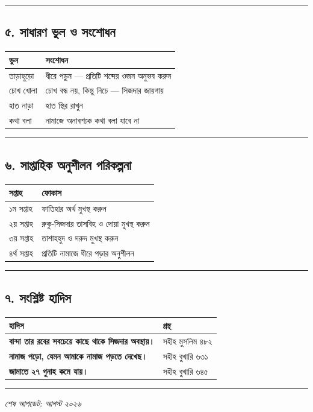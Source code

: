 \medskip\hrule\medskip

\subsection*{৫. সাধারণ ভুল ও সংশোধন}

\begin{table}[h]\centering\small
\begin{tabular}{ll}
ভুল & সংশোধন \\
\hline
তাড়াহুড়ো & ধীরে পড়ুন — প্রতিটি শব্দের ওজন অনুভব করুন \\
চোখ খোলা & চোখ বন্ধ নয়, কিন্তু নিচে — সিজদার জায়গায় \\
হাত নাড়া & হাত স্থির রাখুন \\
কথা বলা & নামাজে অনাবশ্যক কথা বলা যাবে না \\
\hline
\end{tabular}
\end{table}

\medskip\hrule\medskip

\subsection*{৬. সাপ্তাহিক অনুশীলন পরিকল্পনা}

\begin{table}[h]\centering\small
\begin{tabular}{ll}
সপ্তাহ & ফোকাস \\
\hline
১ম সপ্তাহ & ফাতিহার অর্থ মুখস্থ করুন \\
২য় সপ্তাহ & রুকু-সিজদার তাসবিহ ও দোয়া মুখস্থ করুন \\
৩য় সপ্তাহ & তাশাহহুদ ও দরুদ মুখস্থ করুন \\
৪র্থ সপ্তাহ & প্রতিটি নামাজে ধীরে পড়ার অনুশীলন \\
\hline
\end{tabular}
\end{table}

\medskip\hrule\medskip

\subsection*{৭. সংশ্লিষ্ট হাদিস}

\begin{table}[h]\centering\small
\begin{tabular}{ll}
হাদিস & গ্রন্থ \\
\hline
\textbf{\lat{“}বান্দা তার রবের সবচেয়ে কাছে থাকে সিজদার অবস্থায়।\lat{”}} & সহীহ মুসলিম ৪৮২ \\
\textbf{\lat{“}নামাজ পড়ো, যেমন আমাকে নামাজ পড়তে দেখেছ।\lat{”}} & সহীহ বুখারি ৬৩১ \\
\textbf{\lat{“}জামাতে ২৭ গুনাহ কমে যায়।\lat{”}} & সহীহ বুখারি ৬৪৫ \\
\hline
\end{tabular}
\end{table}

\medskip\hrule\medskip

\textit{শেষ আপডেট: আগস্ট ২০২৬}


